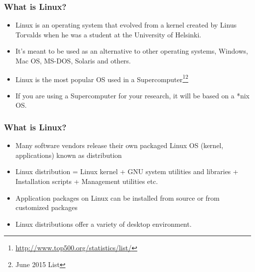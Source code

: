 \documentclass[10pt,t]{beamer}
\begin{document}
\begin{frame}
  \frametitle{What is Linux?}
  \begin{itemize}
    \item Linux is an operating system that evolved from a kernel created by Linus Torvalds when he was a student at the University of Helsinki. 
    \item It's meant to be used as an alternative to other operating systems, Windows, Mac OS, MS-DOS, Solaris and others. 
    \item Linux is the most popular OS used in a Supercomputer\let\thefootnote\relax\footnote{\tiny \url{http://www.top500.org/statistics/list/}}\let\thefootnote\relax\footnote{\tiny June 2015 List}
      
    \item If you are using a Supercomputer for your research, it will be based on a *nix OS.
  \end{itemize}
\end{frame}

\begin{frame}
  \frametitle{What is Linux?}
  \begin{itemize}
    \item Many software vendors release their own packaged Linux OS (kernel, applications) known as distribution
    \item Linux distribution = Linux kernel + GNU system utilities and libraries + Installation scripts + Management utilities etc.
    \item Application packages on Linux can be installed from source or from customized packages
    \item Linux distributions offer a variety of desktop environment.
  \end{itemize}
\end{frame}
\end{document}
